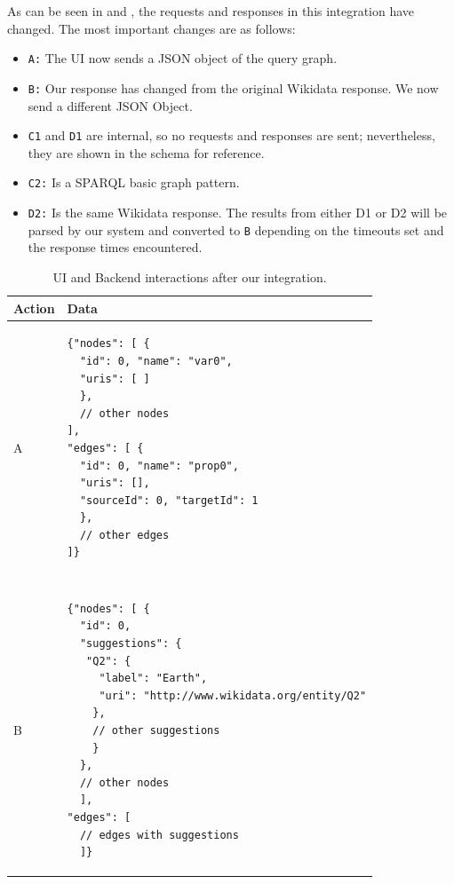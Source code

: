 As can be seen in  and , the requests and responses in this integration have changed. The most important changes are as follows:
\begin{itemize}
    \item \texttt{A:} The UI now sends a JSON object of the query graph.
    \item \texttt{B:} Our response has changed from the original Wikidata response. We now send a different JSON Object.
    \item \texttt{C1} and \texttt{D1} are internal, so no requests and responses are sent; nevertheless, they are shown in the schema for reference.
    \item \texttt{C2:} Is a SPARQL basic graph pattern.
    \item \texttt{D2:} Is the same Wikidata response. The results from either D1 or D2 will be parsed by our system and converted to \texttt{B} depending on the timeouts set and the response times encountered.
\end{itemize}
 
\begin{table}[h]
\centering
\begin{tabular}{ll}
Action & Data \\ 
\hline
A              
& \begin{minipage}[t]{0.85\linewidth}
\begin{verbatim}
{"nodes": [ {
  "id": 0, "name": "var0",
  "uris": [ ]
  },
  // other nodes
],
"edges": [ {
  "id": 0, "name": "prop0",
  "uris": [],
  "sourceId": 0, "targetId": 1
  },
  // other edges
]}
\end{verbatim}
\end{minipage}
\\ \\ \\
B             
& \begin{minipage}[t]{0.85\linewidth}
\begin{verbatim}
{"nodes": [ {
  "id": 0, 
  "suggestions": {
   "Q2": {
     "label": "Earth",
     "uri": "http://www.wikidata.org/entity/Q2"
    }, 
    // other suggestions
    } 
  },
  // other nodes
  ], 
"edges": [ 
  // edges with suggestions
  ]}
\end{verbatim}
\end{minipage}
\\
\end{tabular}
\caption{UI and Backend interactions after our integration.}
\label{table:uiAfterRequest1}
\end{table}


